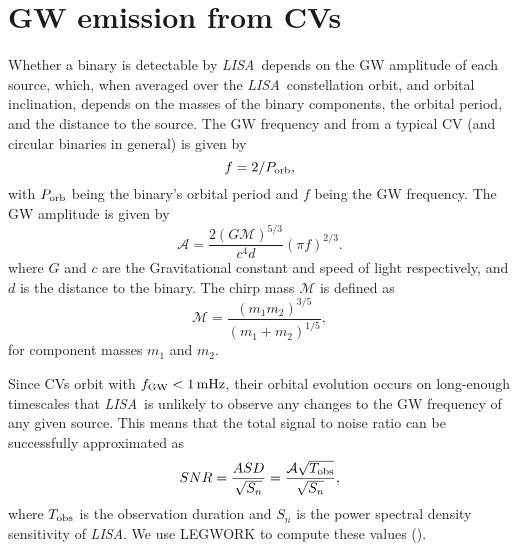 \documentclass[fleqn,usenatbib]{mnras}
\newcommand{\lisa}{{\it LISA}}
\begin{document}
\section{GW emission from CVs} \label{sec:gwemission}


Whether a binary is detectable by \lisa\ depends on the GW amplitude of each source, which, when averaged over the \lisa\ constellation orbit, and orbital inclination, depends on the masses of the binary components, the orbital period, and the distance to the source. The GW frequency and from a typical CV (and circular binaries in general) is given by
\begin{equation}
    f = 2/P_{\rm orb},
\end{equation}
with $P_{\rm orb}$ being the binary's orbital period and $f$ being the GW frequency. The GW amplitude is given by
\begin{equation}\label{eqn:amp}
    \mathcal{A} = \frac{2 (G \mathcal{M})^{5/3} }{c^4 d} (\pi f)^{2/3}.
\end{equation}
where $G$ and $c$ are the Gravitational constant and speed of light respectively, and $d$ is the distance to the binary. The chirp mass $\mathcal{M}$ is defined as
\begin{equation}\label{eqn:mchirp}
    \mathcal{M} = \frac{(m_1 m_2)^{3/5}}{(m_1 + m_2)^{1/5}}, 
\end{equation}
for component masses $m_1$ and $m_2$.

Since CVs orbit with $f_{\rm{GW}} < 1\,\rm{mHz}$, their orbital evolution occurs on long-enough timescales that \lisa\ is unlikely to observe any changes to the GW frequency of any given source. This means that the total signal to noise ratio can be successfully approximated as
\begin{equation}\label{eq:SNR}
    SNR = \frac{ASD}{\sqrt{S_n}} = \frac{\mathcal{A}\sqrt{T_{\rm{obs}}}}{\sqrt{S_n}},
\end{equation}
\noindent where $T_{\rm{obs}}$ is the observation duration and $S_n$ is the power spectral density sensitivity of \lisa. We use LEGWORK to compute these values (\citealt{LEGWORK_apjs,LEGWORK_joss}).
\end{document}
